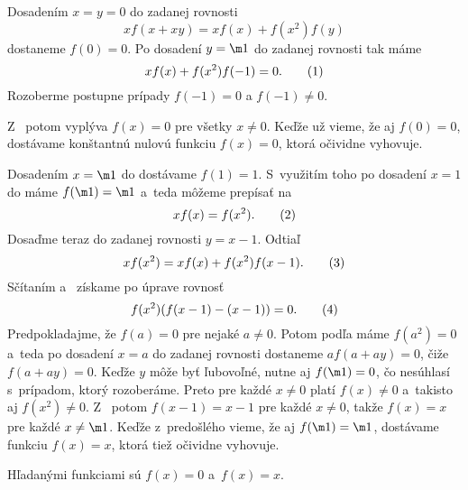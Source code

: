 {%
Dosadením $x=y=0$ do zadanej rovnosti
$$
xf(x+xy)=xf(x)+f(x^2)f(y)
$$
dostaneme $f(0)=0$. Po dosadení $y=\m1$ do zadanej rovnosti tak máme
$$
xf(x)+f(x^2)f(-1)=0.
\tag1
$$
Rozoberme postupne prípady $f(-1)=0$ a $f(-1)\ne0$.

Z~ potom vyplýva $f(x)=0$ pre všetky $x\ne0$. Keďže už vieme, že aj $f(0)=0$, dostávame konštantnú nulovú funkciu $f(x)=0$, ktorá očividne vyhovuje.

Dosadením $x=\m1$ do  dostávame $f(1)=1$. S~využitím toho po dosadení $x=1$ do  máme
$f(\m1)=\m1$ a~teda  môžeme prepísať na
$$
xf(x)=f(x^2).
\tag2
$$
Dosaďme teraz do zadanej rovnosti $y=x-1$. Odtiaľ
$$
xf(x^2)=xf(x)+f(x^2)f(x-1).
\tag3
$$
Sčítaním  a~ získame po úprave rovnosť
$$
f(x^2)(f(x-1)-(x-1))=0.
\tag4
$$
Predpokladajme, že $f(a)=0$ pre nejaké $a\ne0$.
Potom podľa  máme $f(a^2)=0$ a~teda po dosadení $x=a$ do zadanej rovnosti dostaneme
$af(a+ay)=0$, čiže $f(a+ay)=0$. Keďže $y$ môže byť ľubovoľné, nutne aj $f(\m1)=0$, čo nesúhlasí s~prípadom, ktorý rozoberáme. Preto pre každé $x\ne0$ platí $f(x)\ne0$ a~takisto aj $f(x^2)\ne0$.
Z~ potom $f(x-1)=x-1$ pre každé $x\ne0$, takže $f(x)=x$ pre každé $x\ne\m1$. Keďže z~predošlého vieme, že aj $f(\m1)=\m1$, dostávame funkciu $f(x)=x$, ktorá tiež očividne vyhovuje.

\zaver
Hľadanými funkciami sú $f(x)=0$ a~$f(x)=x$.
}

